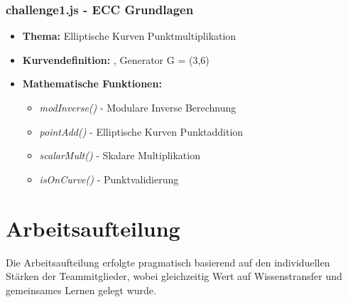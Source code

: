 \documentclass{article}
\begin{document}
\subsubsection{challenge1.js - ECC Grundlagen}
\begin{itemize}
    \item \textbf{Thema:} Elliptische Kurven Punktmultiplikation
    \item \textbf{Kurvendefinition:} , Generator G = (3,6)
    \item \textbf{Mathematische Funktionen:}
    \begin{itemize}
        \item \emph{modInverse()} - Modulare Inverse Berechnung
        \item \emph{pointAdd()} - Elliptische Kurven Punktaddition
        \item \emph{scalarMult()} - Skalare Multiplikation
        \item \emph{isOnCurve()} - Punktvalidierung
    \end{itemize}
\end{itemize}

\section{Arbeitsaufteilung}

\noindent Die Arbeitsaufteilung erfolgte pragmatisch basierend auf den individuellen Stärken der Teammitglieder, wobei gleichzeitig Wert auf Wissenstransfer und gemeinsames Lernen gelegt wurde.
\end{document}
